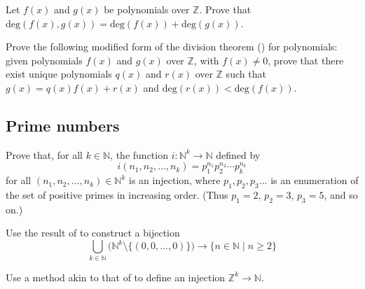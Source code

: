\begin{chapex}
Let $f(x)$ and $g(x)$ be polynomials over $\mathbb{Z}$. Prove that $\mathrm{deg}(f(x),g(x)) = \mathrm{deg}(f(x)) + \mathrm{deg}(g(x))$.
\end{chapex}

\begin{chapex}
Prove the following modified form of the division theorem () for polynomials: given polynomials $f(x)$ and $g(x)$ over $\mathbb{Z}$, with $f(x) \ne 0$, prove that there exist unique polynomials $q(x)$ and $r(x)$ over $\mathbb{Z}$ such that $g(x) = q(x)f(x) + r(x)$ and $\mathrm{deg}(r(x)) < \mathrm{deg}(f(x))$.
\end{chapex}

\subsection*{Prime numbers}

\begin{chapex}
\label{cqInjectionNToTheKToNViaFTA}
Prove that, for all $k \in \mathbb{N}$, the function $i : \mathbb{N}^k \to \mathbb{N}$ defined by
\[ i(n_1,n_2,\dots,n_k) = p_1^{n_1} p_2^{n_2} \cdots p_k^{n_k} \]
for all $(n_1,n_2,\dots,n_k) \in \mathbb{N}^k$ is an injection, where $p_1, p_2, p_3 \dots$ is an enumeration of the set of positive primes in increasing order. (Thus $p_1=2$, $p_2=3$, $p_3=5$, and so on.)
\end{chapex}

\begin{chapex}
\label{cqBijectionSeqNToNViaFTA}
Use the result of  to construct a bijection
\[ \bigcup_{k \in \mathbb{N}} \Big( \mathbb{N}^k \setminus \{ (0,0,\dots,0) \} \Big) \to \{ n \in \mathbb{N} \mid n \ge 2 \} \]
\end{chapex}

\begin{chapex}
\label{cqInjectionZToTheKToNViaFTA}
Use a method akin to that of  to define an injection $\mathbb{Z}^k \to \mathbb{N}$.
\end{chapex}

